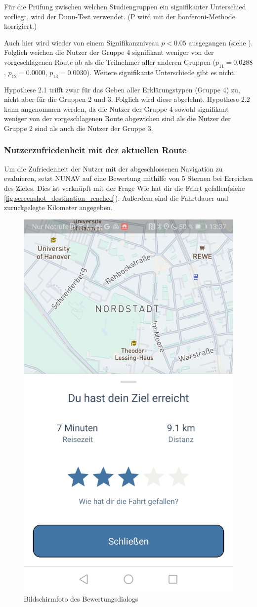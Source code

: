 Für die Prüfung zwischen welchen Studiengruppen ein signifikanter Unterschied vorliegt, wird der Dunn-Test \cite{dunn1964multiple} verwendet. (P wird mit der \glqq bonferoni\grqq{}-Methode korrigiert.)

Auch hier wird wieder von einem Signifikanzniveau $ p < 0.05 $ ausgegangen (siehe ). Folglich weichen die Nutzer der Gruppe 4 signifikant weniger von der vorgeschlagenen Route ab als die Teilnehmer aller anderen Gruppen ($ p_{11} = 0.0288 $, $ p_{12} = 0.0000 $, $ p_{13} = 0.0030 $). Weitere signifikante Unterschiede gibt es nicht.

Hypothese 2.1 trifft zwar für das Geben aller Erklärungstypen (Gruppe 4) zu, nicht aber für die Gruppen 2 und 3. Folglich wird diese abgelehnt. Hypothese 2.2 kann angenommen werden, da die Nutzer der Gruppe 4 sowohl signifikant weniger von der vorgeschlagenen Route abgewichen sind als die Nutzer der Gruppe 2 sind als auch die Nutzer der Gruppe 3.

\subsubsection{Nutzerzufriedenheit mit der aktuellen Route}

Um die Zufriedenheit der Nutzer mit der abgeschlossenen Navigation zu evaluieren, setzt NUNAV auf eine Bewertung mithilfe von 5 Sternen bei Erreichen des Zieles. Dies ist verknüpft mit der Frage \glqq Wie hat dir die Fahrt gefallen\grqq (siehe \autoref{fig:screenshot_destination_reached}). Außerdem sind die Fahrtdauer und zurückgelegte Kilometer angegeben.

\begin{figure}
    \centering
    \includegraphics[width=0.27\linewidth]{contents/06_model_evaluation/02_evaluation/res/rating_screenshot.jpg}
    \caption{Bildschirmfoto des Bewertungsdialogs}
    \label{fig:screenshot_destination_reached}
\end{figure}

